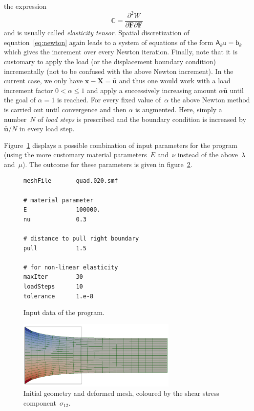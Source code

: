 \documentclass[a4paper,DIV=12,10pt]{scrartcl}
\newcommand{\vek}[1]{\boldsymbol{#1}}  %
\newcommand{\mat}[1]{\mathsf{#1}}      %
\newcommand{\x}[0]{\vek{x}}
\newcommand{\X}[0]{\vek{X}}
\newcommand{\U}[0]{\vek{u}}
\begin{document}
the expression
\begin{equation}
  \label{eq:elasticitytensor}
  \mathbb{C} = \frac{\partial^2 W}{\partial \vek{F} \partial \vek{F}}
\end{equation}
and is usually called \emph{elasticity tensor}.  Spatial
discretization of equation~\eqref{eq:newton} again leads to a system
of equations of the form $\mat{A}_k \mat{u} = \mat{b}_k$ which gives
the increment over every Newton iteration. Finally, note that it is
customary to apply the load (or the displacement boundary condition)
incrementally (not to be confused with the above Newton increment). In
the current case, we only have $\x - \X = \bar{\U}$ and thus one would
work with a load increment factor $0 < \alpha \leq 1$ and apply a
successively increasing amount $\alpha \bar{\U}$ until the goal of
$\alpha = 1$ is reached. For every fixed value of~$\alpha$ the above
Newton method is carried out until convergence and then $\alpha$ is
augmented. Here, simply a number~$N$ of \emph{load steps} is
prescribed and the boundary condition is increased by~$\bar{\U}/N$ in
every load step.

Figure~\ref{fig:inp2a} displays a possible combination of input
parameters for the program (using the more customary material
parameters~$E$ and~$\nu$ instead of the above~$\lambda$ and~$\mu$).
The outcome for these parameters is given in
figure~\ref{fig:deformed}.

\begin{figure}[htbp]
  \centering
  \begin{verbatim}
meshFile       quad.020.smf

# material parameter
E              100000.
nu             0.3

# distance to pull right boundary
pull           1.5

# for non-linear elasticity
maxIter        30
loadSteps      10
tolerance      1.e-8
\end{verbatim}

  \caption{Input data of the program.}
  \label{fig:inp2a}
\end{figure}

\begin{figure}[htbp]
  \centering
  \includegraphics[width=0.7\textwidth]{deformed}
  \caption{Initial geometry and deformed mesh, coloured by the shear
    stress component~$\sigma_{12}$.}
  \label{fig:deformed}
\end{figure}
\end{document}
